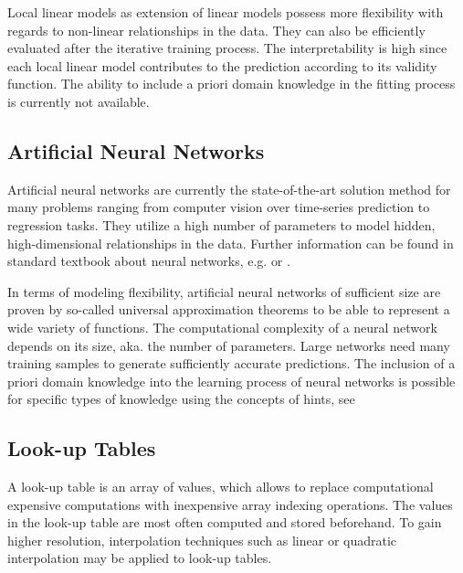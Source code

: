 \documentclass[10pt,a4paper]{article}
\begin{document}
Local linear models as extension of linear models possess more flexibility with regards to non-linear relationships in the data. They can also be efficiently evaluated after the iterative training process. The interpretability is high since each local linear model contributes to the prediction according to its validity function. The ability to include a priori domain knowledge in the fitting process is currently not available.   

\subsection{Artificial Neural Networks}

Artificial neural networks are currently the state-of-the-art solution method for many problems ranging from computer vision over time-series prediction to regression tasks. They utilize a high number of parameters to model hidden, high-dimensional relationships in the data. Further information can be found in standard textbook about neural networks, e.g. \cite{bishop2006patternRecognition} or \cite{goodfellow2016deep}. 

In terms of modeling flexibility, artificial neural networks of sufficient size are proven by so-called universal approximation theorems to be able to represent a wide variety of functions.\cite{cybenko1989approximation} \cite{hornik1991approximation} The computational complexity of a neural network depends on its size, aka. the number of parameters. Large networks need many training samples to generate sufficiently accurate predictions. The inclusion of a priori domain knowledge into the learning process of neural networks is possible for specific types of knowledge using the concepts of hints, see \cite{abu1990learning} \cite{sill1997monotonicity}

\subsection{Look-up Tables}

A look-up table is an array of values, which allows to replace computational expensive computations with inexpensive array indexing operations. The values in the look-up table are most often computed and stored beforehand. To gain higher resolution, interpolation techniques such as linear or quadratic interpolation may be applied to look-up tables. 
\end{document}
